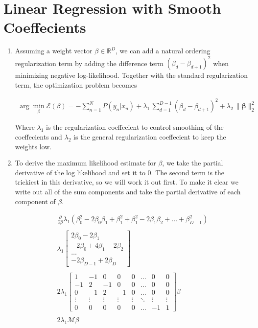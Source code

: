 \documentclass[12pt]{article}
\begin{document}
\section{Linear Regression with Smooth Coeffecients}
\begin{enumerate}[label=\alph*.]
	\item Assuming a weight vector $\beta \in \mathbb{R}^D$, we can add a natural ordering regularization term by adding the difference term $(\beta_d - \beta_{d+1})^2$ when minimizing negative log-likelihood. Together with the standard regularization term, the optimization problem becomes

	\begin{gather*}
		\arg\!\min_{\beta} \mathcal{E}(\beta) = -\sum_{n=1}^N{ P( y_n | x_n ) } + \lambda_1 \, \sum_{d=1}^{D-1}{(\beta_d - \beta_{d+1})^2} +  \lambda_2 \, \lVert \mathbf{\beta} \rVert^2_2
	\end{gather*}

	Where $\lambda_1$ is the regularization coeffecient to control smoothing of the coeffecients and $\lambda_2$ is the general regularization coeffecient to keep the weights low.

	\item To derive the maximum likelihood estimate for $\beta$, we take the partial derivative of the log likelihood and set it to 0. The second term is the trickiest in this derivative, so we will work it out first. To make it clear we write out all of the sum components and take the partial derivative of each component of $\beta$.
	
	\begin{gather*}
		\frac{\partial}{\partial \beta} \lambda_1 ( \beta_0^2 - 2 \beta_0 \beta_1 + \beta_1^2 + \beta_1^2 - 2 \beta_1 \beta_2 + \dots + \beta_{D-1}^2 ) \\
		\\
		\lambda_1	
			\begin{bmatrix}
				2\beta_0 - 2\beta_1 \\
				-2\beta_0 + 4\beta_1 - 2\beta_2 \\
				\dots \\
				-2\beta_{D-1} + 2\beta_D
			\end{bmatrix} \\
		\\
		2 \lambda_1 
			\begin{bmatrix}
				1 & -1 & 0 & 0 & 0 & \dots & 0 & 0 \\
				-1 & 2 & -1 & 0 & 0 & \dots & 0 & 0\\
				0 & -1 & 2 & -1 & 0 & \dots & 0 & 0 \\
				\vdots & \vdots & \vdots & \vdots & \vdots & \ddots & \vdots & \vdots \\
				0 & 0 & 0 & 0 & 0 & \dots & -1 & 1 
			\end{bmatrix} \beta \\
		\\
		2 \lambda_1 \mathbf{\mathcal{M}} \beta
	\end{gather*}


\end{enumerate}
\end{document}
